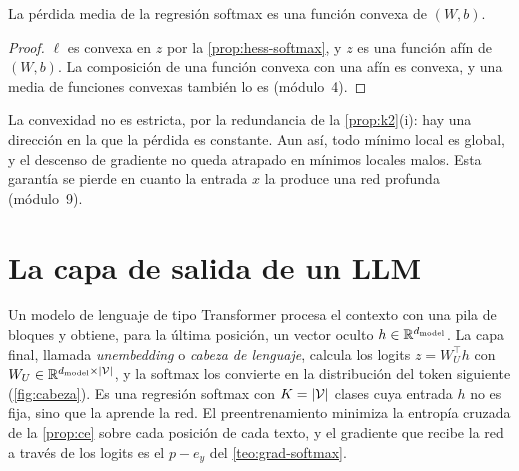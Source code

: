 \begin{corolario}\label{cor:convexa-softmax}
La pérdida media de la regresión softmax es una función convexa de $(W,b)$.
\end{corolario}

\begin{proof}
$\ell$ es convexa en $z$ por la \cref{prop:hess-softmax}, y $z$ es una función afín de $(W,b)$. La composición de una función convexa con una afín es convexa, y una media de funciones convexas también lo es (módulo~4).
\end{proof}

La convexidad no es estricta, por la redundancia de la \cref{prop:k2}(i): hay una dirección en la que la pérdida es constante. Aun así, todo mínimo local es global, y el descenso de gradiente no queda atrapado en mínimos locales malos. Esta garantía se pierde en cuanto la entrada $x$ la produce una red profunda (módulo~9).

\section{La capa de salida de un LLM}

Un modelo de lenguaje de tipo Transformer procesa el contexto con una pila de bloques y obtiene, para la última posición, un vector oculto $h\in\mathbb{R}^{d_{\text{model}}}$. La capa final, llamada \emph{unembedding} o \emph{cabeza de lenguaje}, calcula los logits $z=W_U^{\top}h$ con $W_U\in\mathbb{R}^{d_{\text{model}}\times\lvert\mathcal{V}\rvert}$, y la softmax los convierte en la distribución del token siguiente (\cref{fig:cabeza}). Es una regresión softmax con $K=\lvert\mathcal{V}\rvert$ clases cuya entrada $h$ no es fija, sino que la aprende la red. El preentrenamiento minimiza la entropía cruzada de la \cref{prop:ce} sobre cada posición de cada texto, y el gradiente que recibe la red a través de los logits es el $p-e_y$ del \cref{teo:grad-softmax}.

